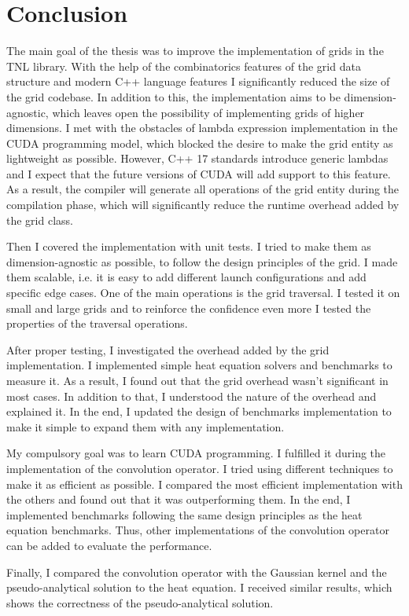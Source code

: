 \chapter*{Conclusion}

The main goal of the thesis was to improve the implementation of grids in the TNL library.
With the help of the combinatorics features of the grid data structure and modern C++ language features I significantly reduced the size of the grid codebase.
In addition to this, the implementation aims to be dimension-agnostic, which leaves open the possibility of implementing grids of higher dimensions.
I met with the obstacles of lambda expression implementation in the CUDA programming model, which blocked the desire to make the grid entity as lightweight as possible.
However, C++ 17 standards introduce generic lambdas and I expect that the future versions of CUDA will add support to this feature.
As a result, the compiler will generate all operations of the grid entity during the compilation phase, which will significantly reduce the runtime overhead added by the grid class.

Then I covered the implementation with unit tests.
I tried to make them as dimension-agnostic as possible, to follow the design principles of the grid.
I made them scalable, i.e. it is easy to add different launch configurations and add specific edge cases.
One of the main operations is the grid traversal.
I tested it on small and large grids and to reinforce the confidence even more I tested the properties of the traversal operations.

After proper testing, I investigated the overhead added by the grid implementation.
I implemented simple heat equation solvers and benchmarks to measure it.
As a result, I found out that the grid overhead wasn't significant in most cases.
In addition to that, I understood the nature of the overhead and explained it.
In the end, I updated the design of benchmarks implementation to make it simple to expand them with any implementation.

My compulsory goal was to learn CUDA programming.
I fulfilled it during the implementation of the convolution operator.
I tried using different techniques to make it as efficient as possible.
I compared the most efficient implementation with the others and found out that it was outperforming them.
In the end, I implemented benchmarks following the same design principles as the heat equation benchmarks.
Thus, other implementations of the convolution operator can be added to evaluate the performance.

Finally, I compared the convolution operator with the Gaussian kernel and the pseudo-analytical solution to the heat equation.
I received similar results, which shows the correctness of the pseudo-analytical solution.

